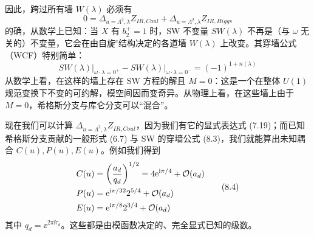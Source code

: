因此，跨过所有墙 $W(\lambda)$ 必须有
\begin{equation}
0=\Delta_{u=\Lambda^{2},\lambda}Z_{IR,Coul}+\Delta_{u=\Lambda^{2},\lambda}Z_{IR,Higgs}
\tag{8.2}
\end{equation}
的确，从数学上已知：当 $X$ 有 $b_2^{+}=1$ 时，SW 不变量 $SW(\lambda)$ 不再是（与 $\omega$ 无关的）不变量，它会在由自旋$^{c}$结构决定的各道墙 $W(\lambda)$ 上改变。其穿墙公式（WCF）特别简单：
\begin{equation}
SW(\lambda)\big|_{\omega\cdot\lambda=0^{+}}
-
SW(\lambda)\big|_{\omega\cdot\lambda=0^{-}}
=
(-1)^{1+n(\lambda)}
\tag{8.3}
\end{equation}
从数学上看，在这样的墙上存在 SW 方程的解且 $M=0$：这是一个在整体 $U(1)$ 规范变换下不变的可约解，模空间因而变奇异。从物理上看，在这些墙上由于 $M=0$，希格斯分支与库仑分支可以“混合”。

现在我们可以计算 $\Delta_{u=\Lambda^{2},\lambda}Z_{IR,Coul}$，因为我们有它的显式表达式 (7.19)；而已知希格斯分支贡献的一般形式 (6.7) 与 SW 的穿墙公式 (8.3)，我们就能算出未知耦合 $C(u),P(u),E(u)$。例如我们得到
\begin{equation}
\begin{aligned}
C(u) &= \left(\frac{a_d}{q_d}\right)^{1/2}=4\mathrm{e}^{\mathrm{i}\pi/4}+\mathcal{O}(a_d)\\
P(u) &= \mathrm{e}^{\mathrm{i}\pi/32}2^{5/4}+\mathcal{O}(a_d)\\
E(u) &= \mathrm{e}^{\mathrm{i}\pi/8}2^{3/4}+\mathcal{O}(a_d)
\end{aligned}
\tag{8.4}
\end{equation}
其中 $q_d=\ee^{2\pi\ii\tau_d}$。这些都是由模函数决定的、完全显式已知的级数。

